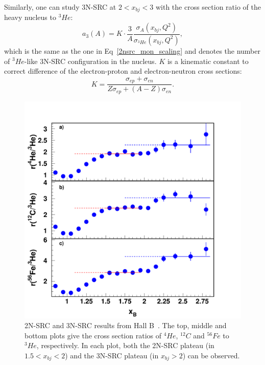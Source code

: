 Similarly, one can study 3N-SRC at $2<x_{bj}<3$ with the cross section ratio of the heavy nucleus to $^{3}He$:
\begin{equation}
  a_{3}(A) = K\cdot\frac{3}{A}\frac{\sigma_{A}(x_{bj},Q^{2})}{\sigma_{^{3}He}(x_{bj},Q^{2})},
  \label{src_a3}
\end{equation}
which is the same as the one in Eq~\eqref{2nsrc_mon_scaling} and denotes the number of $^{3}He$-like 3N-SRC configuration in the nucleus. $K$ is a kinematic constant to correct difference of the electron-proton and electron-neutron cross sections:
\begin{equation}
  K = \frac{\sigma_{ep}+\sigma_{en}}{Z\sigma_{ep}+(A-Z)\sigma_{en}}.
\end{equation}
\begin{figure}[!ht]
  \begin{center}
    \includegraphics[type=pdf,ext=.pdf,read=.pdf,width=0.60\linewidth]{./figures/physics/CLAS_2NSRC_3NSRC}
    \caption[2N-SRC and 3N-SRC results from Hall B]{\footnotesize{2N-SRC and 3N-SRC results from Hall B~\cite{PhysRevLett.96.082501}. The top, middle and bottom plots give the cross section ratios of $^{4}He$, $^{12}C$ and $^{56}Fe$ to $^{3}He$, respectively. In each plot, both the 2N-SRC plateau (in $1.5<x_{bj}<2$) and the 3N-SRC plateau (in $x_{bj}>2$) can be observed.}}
    \label{CLAS_2NSRC_3NSRC}
  \end{center}
\end{figure} 

